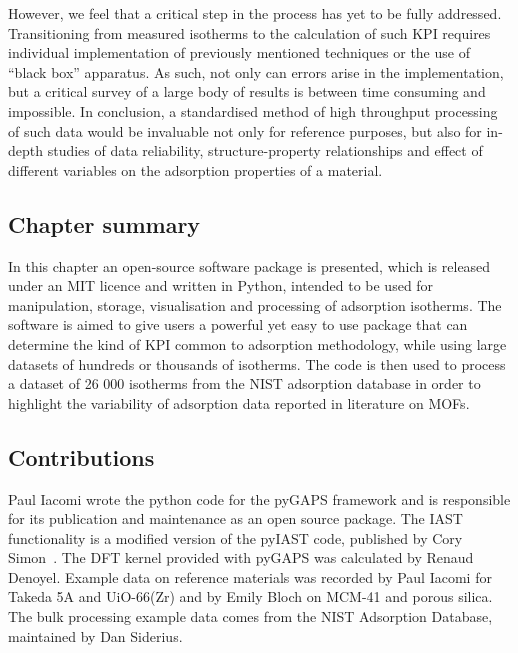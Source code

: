 However, we feel that a critical step in the process has yet
to be fully addressed. Transitioning from measured isotherms
to the calculation of such \gls{KPI} requires individual
implementation of previously mentioned techniques or the use of 
``black box'' apparatus. As such,
not only can errors arise in the implementation, but
a critical survey of a large body of results is between time consuming
and impossible. In conclusion, a standardised method of high throughput
processing of such data would be invaluable not only for reference purposes,
but also for in-depth studies of data reliability,
structure-property relationships and effect of different variables on
the adsorption properties of a material.

\subsection*{Chapter summary}

In this chapter an open-source software package is presented, which
is released under an MIT licence and written in Python, intended to be
used for manipulation, storage, visualisation and processing of
adsorption isotherms. The software is aimed to give users a powerful
yet easy to use package that can determine the kind of \gls{KPI}
common to adsorption methodology, while using large datasets of hundreds
or thousands of isotherms. The code is then used to process a
dataset of 26 000 isotherms from the \gls{NIST} adsorption database in order
to highlight the variability of adsorption data reported in literature
on \glspl{MOF}.

\subsection*{Contributions}

Paul Iacomi wrote the python code for the pyGAPS framework and is
responsible for its publication and maintenance as an open source
package. The \gls{IAST} functionality is a modified version of
the pyIAST code, published by Cory 
Simon~\cite{simonPyIASTIdealAdsorbed2016}. The DFT kernel 
provided with pyGAPS was calculated by Renaud Denoyel. 
Example data on reference materials was recorded by Paul Iacomi 
for Takeda 5A and UiO-66(Zr) and by Emily Bloch on MCM-41 and
porous silica. The bulk processing
example data comes from the \gls{NIST} Adsorption Database, 
maintained by Dan Siderius.
